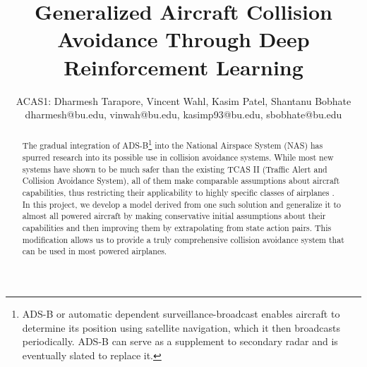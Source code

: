 \documentclass[journal, a4paper]{IEEEtran}
\begin{document}
    \title{Generalized Aircraft Collision Avoidance Through Deep Reinforcement Learning }
    \author{ACAS1: Dharmesh Tarapore, Vincent Wahl, Kasim Patel, Shantanu Bobhate
    \\dharmesh@bu.edu, vinwah@bu.edu, kasimp93@bu.edu, sbobhate@bu.edu
    }
    \maketitle

\begin{abstract}
    The gradual integration of ADS-B\footnote{ADS-B or automatic dependent surveillance-broadcast enables aircraft to determine its position using satellite navigation, which it then broadcasts periodically. ADS-B can serve as a supplement to secondary radar and is eventually slated to replace it.} into the National Airspace System (NAS) has spurred research into its possible use in collision avoidance systems. While most new systems have shown to be much safer than the existing TCAS II (Traffic Alert and Collision Avoidance System), all of them make comparable assumptions about aircraft capabilities, thus restricting their applicability to highly specific classes of airplanes \cite{nextgen}. In this project, we develop a model derived from one such solution and generalize it to almost all powered aircraft by making conservative initial assumptions about their capabilities and then improving them by extrapolating from state action pairs. This modification allows us to provide a truly comprehensive collision avoidance system that can be used in most powered airplanes.   
\end{abstract}

\end{document}
